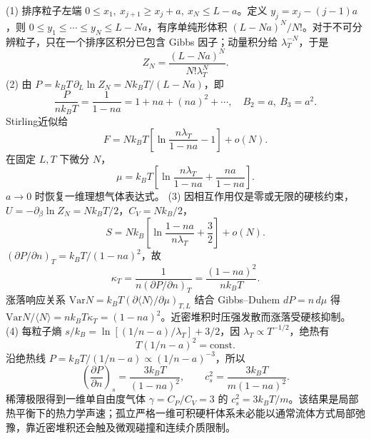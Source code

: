 (1) 排序粒子左端 \(0\le x_1,\ x_{j+1}\ge x_j+a,\ x_N\le L-a\)。定义 \(y_j=x_j-(j-1)a\)，则 \(0\le y_1\le\cdots\le y_N\le L-Na\)，有序单纯形体积 \((L-Na)^N/N!\)。对于不可分辨粒子，只在一个排序区积分已包含 Gibbs 因子；动量积分给 \(\lambda_T^{-N}\)，于是
\[
Z_N=\frac{(L-Na)^N}{N!\lambda_T^N}.
\]
(2) 由 \(P=k_BT\,\partial_L\ln Z_N=Nk_BT/(L-Na)\)，即
\[
\frac{P}{nk_BT}=\frac1{1-na}=1+na+(na)^2+\cdots,\quad B_2=a,\ B_3=a^2.
\]
Stirling近似给
\[
F=Nk_BT\!\left[\ln\frac{n\lambda_T}{1-na}-1\right]+o(N).
\]
在固定 \(L,T\) 下微分 \(N\)，
\[
\mu=k_BT\!\left[\ln\frac{n\lambda_T}{1-na}+
\frac{na}{1-na}\right].
\]
\(a\to0\) 时恢复一维理想气体表达式。
(3) 因相互作用仅是零或无限的硬核约束，\(U=-\partial_\beta\ln Z_N=Nk_BT/2\)，\(C_V=Nk_B/2\)，
\[
S=Nk_B\left[\ln\frac{1-na}{n\lambda_T}+\frac32\right]+o(N).
\]
\((\partial P/\partial n)_T=k_BT/(1-na)^2\)，故
\[
\kappa_T=\frac{1}{n(\partial P/\partial n)_T}
=\frac{(1-na)^2}{nk_BT}.
\]
涨落响应关系 \(\mathrm{Var}N=k_BT(\partial\langle N\rangle/\partial\mu)_{T,L}\) 结合 Gibbs--Duhem \(dP=n\,d\mu\) 得
\(\mathrm{Var}N/\langle N\rangle=nk_BT\kappa_T=(1-na)^2\)。近密堆积时压强发散而涨落受硬核抑制。
(4) 每粒子熵 \(s/k_B=\ln[(1/n-a)/\lambda_T]+3/2\)，因 \(\lambda_T\propto T^{-1/2}\)，绝热有
\[
T(1/n-a)^2=\mathrm{const}.
\]
沿绝热线 \(P=k_BT/(1/n-a)\propto(1/n-a)^{-3}\)，所以
\[
\left(\frac{\partial P}{\partial n}\right)_s=\frac{3k_BT}{(1-na)^2},
\qquad c_s^2=\frac{3k_BT}{m(1-na)^2}.
\]
稀薄极限得到一维单自由度气体 \(\gamma=C_P/C_V=3\) 的 \(c_s^2=3k_BT/m\)。该结果是局部热平衡下的热力学声速；孤立严格一维可积硬杆体系未必能以通常流体方式局部弛豫，靠近密堆积还会触及微观碰撞和连续介质限制。
